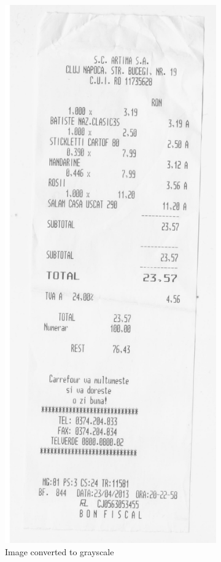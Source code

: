 \begin{figure}
\begin{subfigure}{0.49\linewidth}
  \includegraphics[width=.6\linewidth]{img/gray.jpg}
  \caption{Image converted to grayscale}
  \label{fig:gray_image}
\end{subfigure}
\begin{subfigure}{0.49\linewidth}
  \centering

\end{subfigure}
\end{figure}
